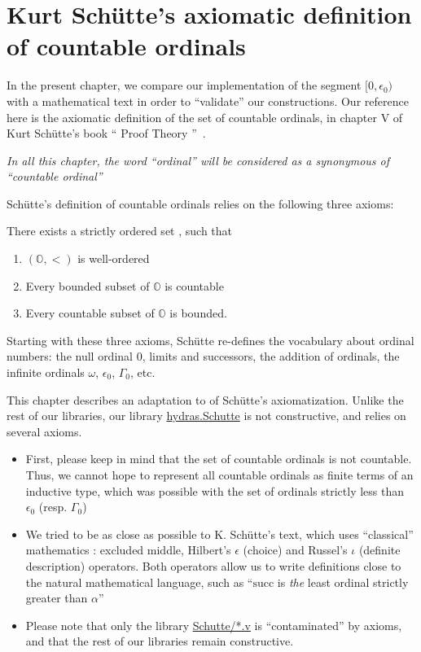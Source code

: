 \chapter[Countable ordinals (after Sch\"{u}tte)]{Kurt Schütte's axiomatic definition of countable ordinals}

\label{chap:schutte} 

In the present chapter, we  compare our implementation of the segment $[0,\epsilon_0)$ with a mathematical text in order to ``validate'' our constructions.
Our reference here is the axiomatic definition of the set of countable ordinals,
in chapter V of Kurt Schütte's book `` Proof Theory ''~\cite{schutte}.

\begin{remark}
\emph{In all this chapter, the word ``ordinal'' will be considered as a synonymous of
``countable ordinal''}  
\end{remark}



Schütte's definition of countable ordinals relies on the following three axioms:

There  exists a strictly ordered set , such that
\begin{enumerate}
\item  $(\mathbb{O},<)$ is well-ordered
\item Every bounded subset of $\mathbb{O}$  is countable
\item Every countable subset of $\mathbb{O}$  is bounded.
\end{enumerate}

Starting with these three axioms, Schütte re-defines the vocabulary about ordinal numbers: the null ordinal $0$, limits and successors, the addition of ordinals, the infinite ordinals $\omega$, $\epsilon_0$, $\Gamma_0$, etc.

This chapter describes an adaptation to \coq{} of Schütte's axiomatization. 
 Unlike the rest of our libraries, our library
\href{../theories/html/hydras.Schutte.Schutte.html}{hydras.Schutte}
is not constructive, and relies on several axioms.

\begin{itemize}
\item First, please keep in mind  that the set of countable ordinals is not countable. Thus, we cannot hope to represent all countable ordinals as finite terms of an inductive type, which was possible with  the set of ordinals strictly less than $\epsilon_0$ (resp. $\Gamma_0$)
\item We tried to be as close as possible to K. Schütte's text, which uses ``classical'' mathematics : excluded middle, Hilbert's $\epsilon$ (choice) and Russel's $\iota$ (definite description) operators. Both operators allow us to write definitions close to the natural mathematical language, such as ``$\textrm{succ}$ is \emph{the} least ordinal strictly greater than $\alpha$''
\item Please note that only the library \href{../theories/html/hydras.Schutte.Schutte.html}{Schutte/*.v} is ``contaminated'' by axioms, and that the rest of our libraries remain constructive.
\end{itemize}

